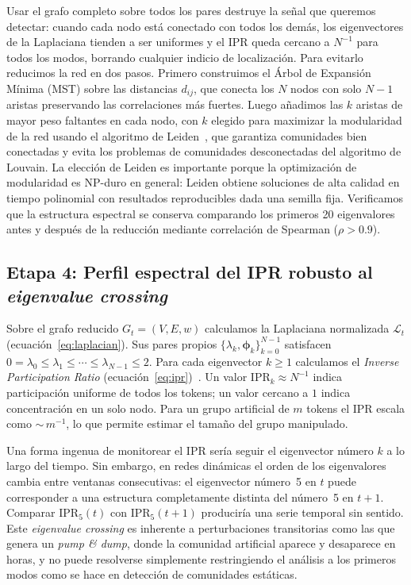 Usar el grafo completo sobre todos los pares destruye la señal que
queremos detectar: cuando cada nodo está conectado con todos los demás,
los eigenvectores de la Laplaciana tienden a ser uniformes y el IPR
queda cercano a $N^{-1}$ para todos los modos, borrando cualquier
indicio de localización. Para evitarlo reducimos la red en dos pasos.
Primero construimos el Árbol de Expansión Mínima (MST) sobre las
distancias $d_{ij}$, que conecta los $N$ nodos con solo $N-1$ aristas
preservando las correlaciones más fuertes. Luego añadimos las $k$
aristas de mayor peso faltantes en cada nodo, con $k$ elegido para
maximizar la modularidad de la red usando el algoritmo de
Leiden~\cite{traag2019}, que garantiza comunidades bien conectadas y
evita los problemas de comunidades desconectadas del algoritmo de
Louvain. La elección de Leiden es importante porque la optimización de
modularidad es NP-duro en general: Leiden obtiene soluciones de alta
calidad en tiempo polinomial con resultados reproducibles dada una
semilla fija. Verificamos que la estructura espectral se conserva
comparando los primeros 20 eigenvalores antes y después de la reducción
mediante correlación de Spearman ($\rho > 0.9$).

\subsection{Etapa 4: Perfil espectral del IPR robusto al \emph{eigenvalue crossing}}

Sobre el grafo reducido $G_t = (V, E, w)$ calculamos la Laplaciana
normalizada $\mathcal{L}_t$ (ecuación~\eqref{eq:laplacian}). Sus pares
propios $\{\lambda_k, \boldsymbol{\phi}_k\}_{k=0}^{N-1}$ satisfacen
$0 = \lambda_0 \leq \lambda_1 \leq \cdots \leq \lambda_{N-1} \leq 2$.
Para cada eigenvector $k \geq 1$ calculamos el \emph{Inverse Participation
Ratio} (ecuación~\eqref{eq:ipr})~\cite{anderson1958absence}. Un valor
$\mathrm{IPR}_k \approx N^{-1}$ indica participación uniforme de todos
los tokens; un valor cercano a $1$ indica concentración en un solo nodo.
Para un grupo artificial de $m$ tokens el IPR escala como
${\sim}\,m^{-1}$, lo que permite estimar el tamaño del grupo manipulado.

Una forma ingenua de monitorear el IPR sería seguir el eigenvector
número $k$ a lo largo del tiempo. Sin embargo, en redes dinámicas el
orden de los eigenvalores cambia entre ventanas consecutivas: el
eigenvector número~5 en $t$ puede corresponder a una estructura
completamente distinta del número~5 en $t+1$. Comparar
$\mathrm{IPR}_5(t)$ con $\mathrm{IPR}_5(t+1)$ produciría una serie
temporal sin sentido. Este \emph{eigenvalue crossing} es inherente a
perturbaciones transitorias como las que genera un \emph{pump \& dump},
donde la comunidad artificial aparece y desaparece en horas, y no puede
resolverse simplemente restringiendo el análisis a los primeros modos
como se hace en detección de comunidades estáticas.

